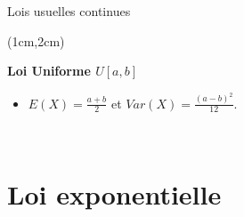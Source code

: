 \documentclass{beamer}
\begin{document}
 

\begin{frame}{Lois usuelles continues}
\begin{textblock*}{\textwidth}(1cm,2cm)

\begin{center}{\bf \Large Loi Uniforme $U[a,b]$} \end{center}
\begin{itemize}
 \item $E(X)=\frac{a+b}{2}$ et $Var(X)=\frac{(a-b)^2}{12}$.\\
\end{itemize}

\



\end{textblock*}

\end{frame}

\section{Loi exponentielle}
\end{document}
